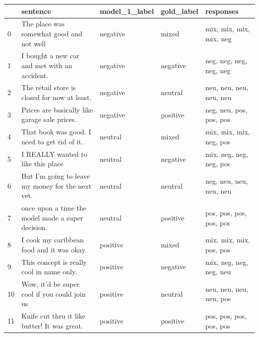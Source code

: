\begin{tabular}{lllll}
\toprule
{} &                                           sentence & model\_1\_label & gold\_label &                responses \\
\midrule
0  &           The place was somewhat good and not well &      negative &      mixed &  mix, mix, mix, mix, neg \\
1  &       I bought a new car and met with an accident. &      negative &   negative &  neg, neg, neg, neg, neg \\
2  &       The retail store is closed for now at least. &      negative &    neutral &  neu, neu, neu, neu, neu \\
3  &      Prices are basically like garage sale prices. &      negative &   positive &  neg, neu, pos, pos, pos \\
4  &      That book was good.  I need to get rid of it. &       neutral &      mixed &  mix, mix, mix, neg, pos \\
5  &                 I REALLY wanted to like this place &       neutral &   negative &  mix, neg, neg, neg, pos \\
6  &  But I'm going to leave my money for the next vet. &       neutral &    neutral &  neg, neu, neu, neu, neu \\
7  &  once upon a time the model made a super decision. &       neutral &   positive &  pos, pos, pos, pos, pos \\
8  &           I cook my caribbean food and it was okay &      positive &      mixed &  mix, mix, mix, pos, pos \\
9  &          This concept is really cool in name only. &      positive &   negative &  mix, neg, neg, neg, neu \\
10 &       Wow, it'd be super cool if you could join us &      positive &    neutral &  neu, neu, neu, neu, pos \\
11 &       Knife cut thru it like butter! It was great. &      positive &   positive &  pos, pos, pos, pos, pos \\
\bottomrule
\end{tabular}
